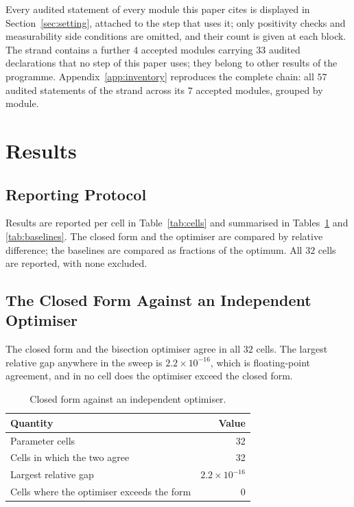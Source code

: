 \documentclass[conference]{IEEEtran}
\theoremstyle{definition}
\begin{document}
Every audited statement of every module this paper cites is displayed in
Section~\ref{sec:setting}, attached to the step that uses it; only positivity checks and
measurability side conditions are omitted, and their count is given at each block. The
strand contains a further $4$ accepted modules carrying $33$ audited declarations that no
step of this paper uses; they belong to other results of the programme. Appendix~\ref{app:inventory} reproduces the complete chain: all $57$ audited statements of the strand across its $7$ accepted modules, grouped by module.

\section{Results}
\label{sec:results}

\subsection{Reporting Protocol}

Results are reported per cell in Table~\ref{tab:cells} and summarised in
Tables~\ref{tab:numeric} and \ref{tab:baselines}. The closed form and the optimiser are
compared by relative difference; the baselines are compared as fractions of the optimum.
All $32$ cells are reported, with none excluded.

\subsection{The Closed Form Against an Independent Optimiser}

The closed form and the bisection optimiser agree in all $32$ cells. The largest relative
gap anywhere in the sweep is $2.2\times10^{-16}$, which is floating-point agreement, and in
no cell does the optimiser exceed the closed form.

\begin{table}[htbp]
\caption{Closed form against an independent optimiser.}
\label{tab:numeric}
\centering
\begin{tabular}{@{}lr@{}}
\toprule
Quantity & Value \\
\midrule
Parameter cells                            & 32 \\
Cells in which the two agree               & 32 \\
Largest relative gap                       & $2.2\times10^{-16}$ \\
Cells where the optimiser exceeds the form & 0 \\
\bottomrule
\end{tabular}
\end{table}
\end{document}
